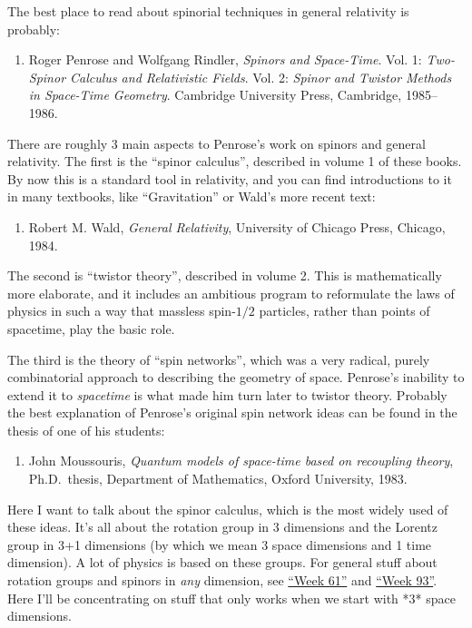 \documentclass{article}
\def\tightlist{}
\begin{document}
The best place to read about spinorial techniques in general relativity
is probably:

\begin{enumerate}
\def\labelenumi{\arabic{enumi})}
\setcounter{enumi}{2}
\tightlist
\item
  Roger Penrose and Wolfgang Rindler, \emph{Spinors and Space-Time}.
  Vol. 1: \emph{Two-Spinor Calculus and Relativistic Fields}. Vol. 2:
  \emph{Spinor and Twistor Methods in Space-Time Geometry}. Cambridge
  University Press, Cambridge, 1985--1986.
\end{enumerate}

There are roughly 3 main aspects to Penrose's work on spinors and
general relativity. The first is the ``spinor calculus'', described in
volume 1 of these books. By now this is a standard tool in relativity,
and you can find introductions to it in many textbooks, like
``Gravitation'' or Wald's more recent text:

\begin{enumerate}
\def\labelenumi{\arabic{enumi})}
\setcounter{enumi}{3}
\tightlist
\item
  Robert M. Wald, \emph{General Relativity}, University of Chicago
  Press, Chicago, 1984.
\end{enumerate}

The second is ``twistor theory'', described in volume 2. This is
mathematically more elaborate, and it includes an ambitious program to
reformulate the laws of physics in such a way that massless spin-\(1/2\)
particles, rather than points of spacetime, play the basic role.

The third is the theory of ``spin networks'', which was a very radical,
purely combinatorial approach to describing the geometry of space.
Penrose's inability to extend it to \emph{spacetime} is what made him
turn later to twistor theory. Probably the best explanation of Penrose's
original spin network ideas can be found in the thesis of one of his
students:

\begin{enumerate}
\def\labelenumi{\arabic{enumi})}
\setcounter{enumi}{4}
\tightlist
\item
  John Moussouris, \emph{Quantum models of space-time based on
  recoupling theory}, Ph.D.~thesis, Department of Mathematics, Oxford
  University, 1983.
\end{enumerate}

Here I want to talk about the spinor calculus, which is the most widely
used of these ideas. It's all about the rotation group in 3 dimensions
and the Lorentz group in 3+1 dimensions (by which we mean 3 space
dimensions and 1 time dimension). A lot of physics is based on these
groups. For general stuff about rotation groups and spinors in
\emph{any} dimension, see \protect\hyperlink{week61}{``Week 61''} and
\protect\hyperlink{week93}{``Week 93''}. Here I'll be concentrating on
stuff that only works when we start with *3* space dimensions.
\end{document}
